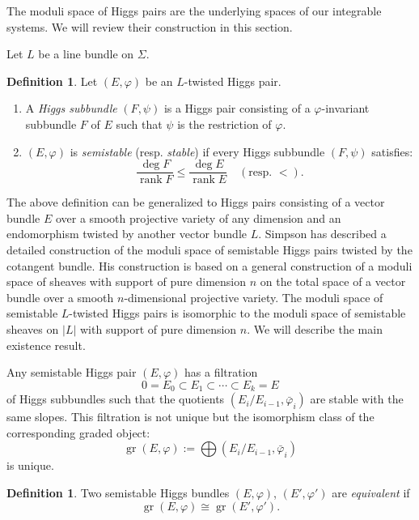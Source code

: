 \documentclass[12pt,a4paper,oneside,english]{smfart}
\theoremstyle{definition}
\newtheorem{defn}[thm]{Definition}
\theoremstyle{remark}
\DeclareMathOperator{\rank}{rank}
\DeclareMathOperator{\gr}{gr}
\newcommand{\tot}[1]{\lvert #1 \rvert}
\begin{document}
The moduli space of Higgs pairs are the underlying spaces of our integrable systems. We will review their construction in this section.

Let $L$ be a line bundle on $\Sigma$.

\begin{defn}\label{t3.1}
Let $(E, \varphi)$ be an $L$-twisted Higgs pair.
\begin{enumerate}
    \item A \emph{Higgs subbundle} $(F, \psi)$ is a Higgs pair consisting of a $\varphi$-invariant subbundle $F$ of $E$ such that $\psi$ is the restriction of $\varphi$.
    \item $(E, \varphi)$ is \emph{semistable} (resp. \emph{stable}) if every Higgs subbundle $(F, \psi)$ satisfies:
    \[
    \frac{\deg F}{\rank F} \leqslant \frac{\deg E}{\rank E} \quad (\text{resp. } <).
    \]
\end{enumerate}
\end{defn}

The above definition can be generalized to Higgs pairs consisting of a vector bundle $E$ over a smooth projective variety of any dimension and an endomorphism twisted by another vector bundle $L$. Simpson \cite{Sim} has described a detailed construction of the moduli space of semistable Higgs pairs twisted by the cotangent bundle. His construction is based on a general construction of a moduli space of sheaves with support of pure dimension $n$ on the total space of a vector bundle over a smooth $n$-dimensional projective variety. The moduli space of semistable $L$-twisted Higgs pairs is isomorphic to the moduli space of semistable sheaves on $\tot{L}$ with support of pure dimension $n$. We will describe the main existence result.

Any semistable Higgs pair $(E, \varphi)$ has a filtration
\[
0 = E_0 \subset E_1 \subset \cdots \subset E_k = E
\]
of Higgs subbundles such that the quotients $(E_i / E_{i-1}, \bar{\varphi}_i)$ are stable with the same slopes. This filtration is not unique but the isomorphism class of the corresponding graded object:
\[
\gr(E, \varphi) := \bigoplus (E_i / E_{i-1}, \bar{\varphi}_i)
\]
is unique.

\begin{defn}\label{t3.2}
Two semistable Higgs bundles $(E, \varphi)$, $(E', \varphi')$ are \emph{equivalent} if
\[
\gr(E, \varphi) \cong \gr(E', \varphi').
\]
\end{defn}
\end{document}
